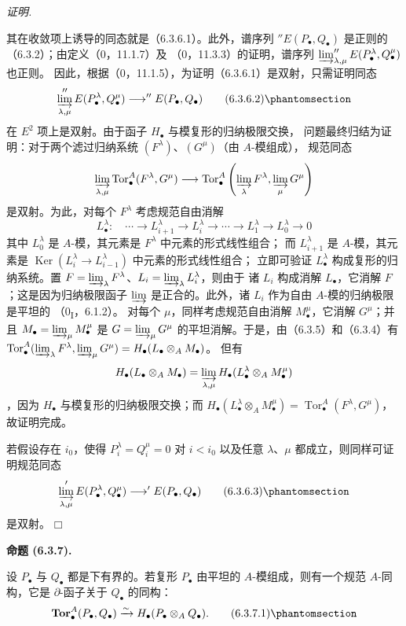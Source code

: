 \documentclass[UTF8,fontset=none,11pt,oneside,openany]{ctexbook}
\providecommand{\square}{\mdlgwhtsquare}
\newenvironment{proposition}[1][]{%
  \par\medskip\noindent\textbf{命题 (#1).}\ %
}{\par}
\newenvironment{proof}{%
  \par\smallskip\noindent\textit{证明.}\ %
}{\hfill$\square$\par}
\let\EGAOriginalLabel\label
\renewcommand{\label}[1]{\phantomsection\EGAOriginalLabel{#1}}
\begin{document}
\begin{proof}
其在收敛项上诱导的同态就是（6.3.6.1）。此外，谱序列
$''E(P_\bullet,Q_\bullet)$ 是正则的（6.3.2）；由定义（0，11.1.7）及
（0，11.3.3）的证明，谱序列
$\varinjlim_{\lambda,\mu}''E(P_\bullet^\lambda,Q_\bullet^\mu)$ 也正则。
因此，根据（0，11.1.5），为证明（6.3.6.1）是双射，只需证明同态
\[
  \varinjlim_{\lambda,\mu}''E(P_\bullet^\lambda,Q_\bullet^\mu)
  \longrightarrow ''E(P_\bullet,Q_\bullet)
  \tag{6.3.6.2}\label{III.6.3.6.2-fr}
\]
在 $E^2$ 项上是双射。由于函子 $H_\bullet$ 与模复形的归纳极限交换，
问题最终归结为证明：对于两个滤过归纳系统 $(F^\lambda)$、$(G^\mu)$（由 $A$-模组成），
规范同态
\[
  \varinjlim_{\lambda,\mu}\operatorname{Tor}_\bullet^A(F^\lambda,G^\mu)
  \longrightarrow
  \operatorname{Tor}_\bullet^A
  \left(\varinjlim_\lambda F^\lambda,
        \varinjlim_\mu G^\mu\right)
\]
是双射。为此，对每个 $F^\lambda$ 考虑规范自由消解
\[
  L_\bullet^\lambda:\quad
  \cdots\longrightarrow L_{i+1}^\lambda
  \longrightarrow L_i^\lambda\longrightarrow\cdots
  \longrightarrow L_1^\lambda\longrightarrow L_0^\lambda\longrightarrow0
\]
其中 $L_0^\lambda$ 是 $A$-模，其元素是 $F^\lambda$ 中元素的形式线性组合；
而 $L_{i+1}^\lambda$ 是 $A$-模，其元素是
$\operatorname{Ker}(L_i^\lambda\to L_{i-1}^\lambda)$ 中元素的形式线性组合；
立即可验证 $L_\bullet^\lambda$ 构成复形的归纳系统。置
$F=\varinjlim_\lambda F^\lambda$、$L_i=\varinjlim_\lambda L_i^\lambda$，则由于
诸 $L_i$ 构成消解 $L_\bullet$，它消解 $F$；这是因为归纳极限函子
$\varinjlim$ 是正合的。此外，诸 $L_i$ 作为自由 $A$-模的归纳极限是平坦的
（0\textsubscript{I}，6.1.2）。
对每个 $\mu$，同样考虑规范自由消解 $M_\bullet^\mu$，它消解 $G^\mu$；并且
$M_\bullet=\varinjlim_\mu M_\bullet^\mu$ 是
$G=\varinjlim_\mu G^\mu$ 的平坦消解。于是，由（6.3.5）和（6.3.4）有
$\operatorname{Tor}_\bullet^A(\varinjlim_\lambda F^\lambda,
\varinjlim_\mu G^\mu)=H_\bullet(L_\bullet\otimes_A M_\bullet)$。
但有
\[
  H_\bullet(L_\bullet\otimes_A M_\bullet)
  =\varinjlim_{\lambda,\mu}
   H_\bullet(L_\bullet^\lambda\otimes_A M_\bullet^\mu)
\]
，因为 $H_\bullet$ 与模复形的归纳极限交换；而
$H_\bullet(L_\bullet^\lambda\otimes_A M_\bullet^\mu)
=\operatorname{Tor}_\bullet^A(F^\lambda,G^\mu)$，故证明完成。

若假设存在 $i_0$，使得 $P_i^\lambda=Q_i^\mu=0$ 对 $i<i_0$ 以及任意
$\lambda$、$\mu$ 都成立，则同样可证明规范同态
\[
  \varinjlim_{\lambda,\mu}'E(P_\bullet^\lambda,Q_\bullet^\mu)
  \longrightarrow'E(P_\bullet,Q_\bullet)
  \tag{6.3.6.3}\label{III.6.3.6.3-fr}
\]
 是双射。
\end{proof}

\begin{proposition}[6.3.7]
设 $P_\bullet$ 与 $Q_\bullet$ 都是下有界的。若复形 $P_\bullet$ 由平坦的
$A$-模组成，则有一个规范 $A$-同构，它是 $\partial$-函子关于 $Q_\bullet$ 的同构：
\[
  \mathbf{Tor}_\bullet^A(P_\bullet,Q_\bullet)
  \xrightarrow{\sim}H_\bullet(P_\bullet\otimes_A Q_\bullet).
  \tag{6.3.7.1}\label{III.6.3.7.1-fr}
\]
\end{proposition}
\end{document}
